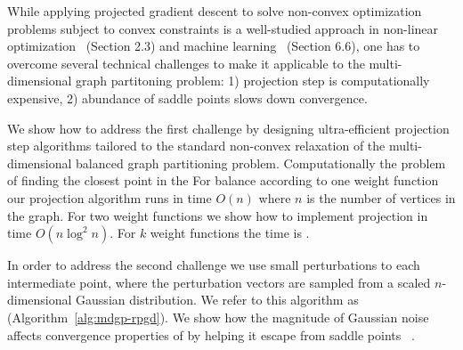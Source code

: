 While applying projected gradient descent to solve  non-convex optimization problems subject to convex constraints is a well-studied approach in non-linear optimization~\cite{B99} (Section 2.3) and machine learning~\cite{JK17} (Section 6.6), one has to overcome several technical challenges to make it applicable to the multi-dimensional graph partitoning problem: 1) projection step is computationally expensive, 2) abundance of saddle points slows down convergence.

We show how to address the first challenge by designing ultra-efficient projection step algorithms tailored to the standard non-convex relaxation of the multi-dimensional balanced graph partitioning problem. Computationally the problem of finding the closest point in the 
 For balance according to one weight function our projection algorithm runs in time $O(n)$ where $n$ is the number of vertices in the graph. For two weight functions we show how to implement projection in time $O(n \log^2 n)$. For $k$ weight functions the time is .

In order to address the second challenge we use small perturbations to each intermediate point, where the perturbation vectors are sampled from a scaled $n$-dimensional Gaussian distribution.  We refer to this algorithm as \algname (Algorithm~\ref{alg:mdgp-rpgd}).
We show how the magnitude of Gaussian noise affects convergence properties of \algname by helping it escape from saddle points~\cite{} .



